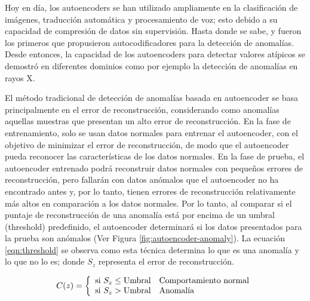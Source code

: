 Hoy en día, los autoencoders se han utilizado ampliamente en la clasificación de imágenes, traducción automática y procesamiento de voz; esto debido a su capacidad de compresión de datos sin supervisión. Hasta donde se sabe,  y  fueron los primeros que propusieron autocodificadores para la detección de anomalías. Desde entonces, la capacidad de los autoencoders para detectar valores at\'{i}picos se demostró en diferentes dominios como por ejemplo la detecci\'{o}n de anomal\'{i}as en rayos X.

\vspace{5mm} %

El m\'{e}todo tradicional de detecci\'{o}n de anomal\'{i}as basada en autoencoder se basa principalmente en el error de reconstrucci\'{o}n, considerando como anomal\'{i}as aquellas muestras que presentan un alto error de reconstrucci\'{o}n. En la fase de entrenamiento, solo se usan datos normales para entrenar el autoencoder, con el objetivo de minimizar el error de reconstrucci\'{o}n, de modo que el autoencoder pueda reconocer las caracter\'{i}sticas de los datos normales. En la fase de prueba, el autoencoder entrenado podr\'{a} reconstruir datos normales con peque\~{n}os errores de reconstrucci\'{o}n, pero fallar\'{a}n con datos an\'{o}malos que el autoencoder no ha encontrado antes y, por lo tanto, tienen errores de reconstrucci\'{o}n relativamente m\'{a}s altos en comparaci\'{o}n a los datos normales. Por lo tanto, al comparar si el puntaje de reconstrucci\'{o}n de una anomal\'{i}a est\'{a} por encima de un umbral (threshold) predefinido, el autoencoder determinar\'{a} si los datos presentados para la prueba son an\'{o}malos \cite{Reference47} (Ver Figura \ref{fig:autoencoder-anomaly}). La ecuaci\'{o}n \ref{eqn:threshold} se observa como esta t\'{e}cnica determina lo que es una anomal\'{i}a y lo que no lo es; donde $S_{z}$ representa el error de reconstrucci\'{o}n.

\begin{equation}
C(z) = \left\lbrace
\begin{array}{ll}
\textup{si } S_{z}\leq \textup{Umbral} & \textup{Comportamiento normal}\\
\textup{si } S_{z}> \textup{Umbral} & \textup{Anomal\'{i}a}
\end{array}
\right.
\label{eqn:threshold}
\end{equation}

